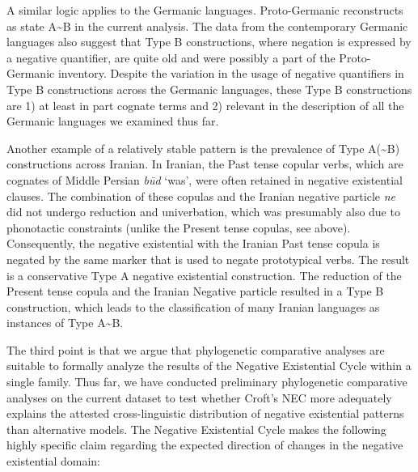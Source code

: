 ﻿\documentclass[output=paper]{langsci/langscibook}
\begin{document}
A similar logic applies to the Germanic languages. Proto-Germanic reconstructs as state A{\textasciitilde}B in the current analysis. The data from the contemporary Germanic languages also suggest that Type B constructions, where negation is expressed by a negative quantifier, are quite old and were possibly a part of the Proto-Germanic inventory. Despite the variation in the usage of negative quantifiers in Type B constructions across the Germanic languages, these Type B constructions are 1) at least in part cognate terms and 2) relevant in the description of all the Germanic languages we examined thus far. 

Another example of a relatively stable pattern is the prevalence of Type
A({\textasciitilde}B) constructions across Iranian. In Iranian, the Past
tense copular verbs, which are cognates of Middle Persian \textit{būd}
`was', were often retained in negative existential clauses. The combination
of these copulas and the Iranian negative particle \textit{ne} did not
undergo reduction and univerbation, which was presumably also due to
phonotactic constraints (unlike the Present tense copulas, see
 above). Consequently, the negative existential with the Iranian Past tense copula is negated by the same marker that is used to negate prototypical verbs. The result is a conservative Type A negative existential construction. The reduction of the Present tense copula and the Iranian Negative particle resulted in a Type B construction, which leads to the classification of many Iranian languages as instances of Type A{\textasciitilde}B. 

  The third point is that we argue that phylogenetic comparative analyses are suitable to formally analyze the results of the Negative Existential Cycle within a single family. Thus far, we have conducted preliminary phylogenetic comparative analyses on the current dataset to test whether Croft's NEC more adequately explains the attested cross-linguistic distribution of negative existential patterns than alternative models. The Negative Existential Cycle makes the following highly specific claim regarding the expected direction of changes in the negative existential domain: 
\end{document}
